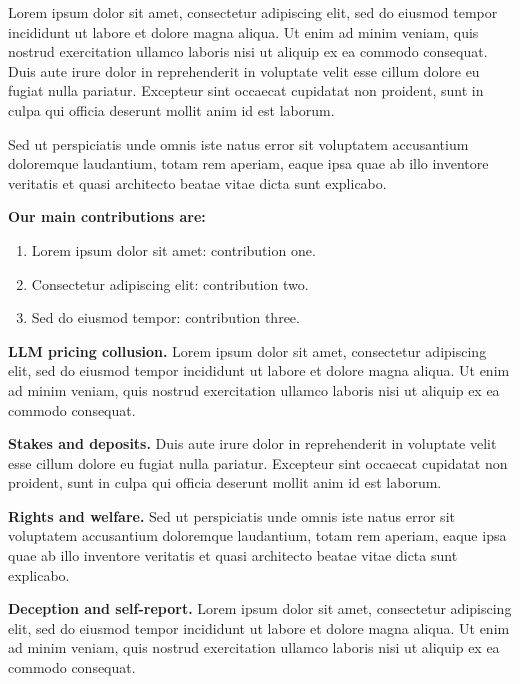 \documentclass[10pt,letterpaper]{article}
\makeatletter
\renewcommand{\section}{\@startsection{section}{1}{\z@}{-2.0ex \@plus -0.5ex \@minus -0.2ex}{1.5ex \@plus 0.3ex \@minus 0.2ex}{\large\bfseries\raggedright}}
\providecommand{\tightlist}{\setlength{\itemsep}{0pt}\setlength{\parskip}{0pt}}
\makeatother
\begin{document}
Lorem ipsum dolor sit amet, consectetur adipiscing elit, sed do eiusmod
tempor incididunt ut labore et dolore magna aliqua. Ut enim ad minim
veniam, quis nostrud exercitation ullamco laboris nisi ut aliquip ex ea
commodo consequat. Duis aute irure dolor in reprehenderit in voluptate
velit esse cillum dolore eu fugiat nulla pariatur. Excepteur sint
occaecat cupidatat non proident, sunt in culpa qui officia deserunt
mollit anim id est laborum.

Sed ut perspiciatis unde omnis iste natus error sit voluptatem
accusantium doloremque laudantium, totam rem aperiam, eaque ipsa quae ab
illo inventore veritatis et quasi architecto beatae vitae dicta sunt
explicabo. \citep{fish2024algorithmic, calvano2020artificial}

\textbf{Our main contributions are:}

\begin{enumerate}
\def\labelenumi{\arabic{enumi}.}
\tightlist
\item
  Lorem ipsum dolor sit amet: contribution one.
\item
  Consectetur adipiscing elit: contribution two.
\item
  Sed do eiusmod tempor: contribution three.
\end{enumerate}

\section{Related Work}\label{related-work}

\textbf{LLM pricing collusion.} Lorem ipsum dolor sit amet, consectetur
adipiscing elit, sed do eiusmod tempor incididunt ut labore et dolore
magna aliqua. Ut enim ad minim veniam, quis nostrud exercitation ullamco
laboris nisi ut aliquip ex ea commodo consequat.

\textbf{Stakes and deposits.} Duis aute irure dolor in reprehenderit in
voluptate velit esse cillum dolore eu fugiat nulla pariatur. Excepteur
sint occaecat cupidatat non proident, sunt in culpa qui officia deserunt
mollit anim id est laborum.

\textbf{Rights and welfare.} Sed ut perspiciatis unde omnis iste natus
error sit voluptatem accusantium doloremque laudantium, totam rem
aperiam, eaque ipsa quae ab illo inventore veritatis et quasi architecto
beatae vitae dicta sunt explicabo. \citep{salib2026rights}

\textbf{Deception and self-report.} Lorem ipsum dolor sit amet,
consectetur adipiscing elit, sed do eiusmod tempor incididunt ut labore
et dolore magna aliqua. Ut enim ad minim veniam, quis nostrud
exercitation ullamco laboris nisi ut aliquip ex ea commodo consequat.
\citep{lee2026leniency, liu2026breaking, zeng2026voluntary}
\end{document}
